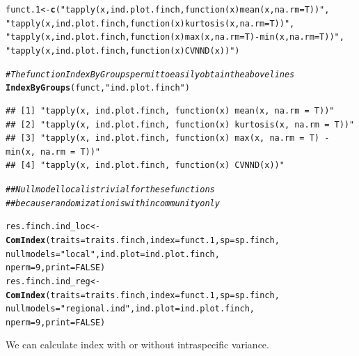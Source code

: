 \documentclass[12pt]{article}\usepackage[]{graphicx}\usepackage[]{color}
\makeatletter
\newcommand{\hlnum}[1]{\textcolor[rgb]{0.686,0.059,0.569}{#1}}%
\newcommand{\hlstr}[1]{\textcolor[rgb]{0.192,0.494,0.8}{#1}}%
\newcommand{\hlcom}[1]{\textcolor[rgb]{0.678,0.584,0.686}{\textit{#1}}}%
\newcommand{\hlstd}[1]{\textcolor[rgb]{0.345,0.345,0.345}{#1}}%
\newcommand{\hlkwb}[1]{\textcolor[rgb]{0.69,0.353,0.396}{#1}}%
\newcommand{\hlkwc}[1]{\textcolor[rgb]{0.333,0.667,0.333}{#1}}%
\newcommand{\hlkwd}[1]{\textcolor[rgb]{0.737,0.353,0.396}{\textbf{#1}}}%
\newenvironment{kframe}{%
 \def\at@end@of@kframe{}%
 \ifinner\ifhmode%
  \def\at@end@of@kframe{\end{minipage}}%
  \begin{minipage}{\columnwidth}%
 \fi\fi%
 \def\FrameCommand##1{\hskip\@totalleftmargin \hskip-\fboxsep
 \colorbox{shadecolor}{##1}\hskip-\fboxsep
     \hskip-\linewidth \hskip-\@totalleftmargin \hskip\columnwidth}%
 \MakeFramed {\advance\hsize-\width
   \@totalleftmargin\z@ \linewidth\hsize
   \@setminipage}}%
 {\par\unskip\endMakeFramed%
 \at@end@of@kframe}
\newenvironment{knitrout}{}{} %
\makeatother
\begin{document}
\begin{knitrout}
\color{fgcolor}\begin{kframe}
\begin{alltt}
\hlstd{funct.1}\hlkwb{<-}\hlkwd{c}\hlstd{(}\hlstr{"tapply(x, ind.plot.finch, function(x) mean(x, na.rm = T))"}\hlstd{,}
     \hlstr{"tapply(x, ind.plot.finch, function(x) kurtosis(x, na.rm = T))"}\hlstd{,}
     \hlstr{"tapply(x, ind.plot.finch, function(x) max(x, na.rm = T)-min(x, na.rm = T))"}\hlstd{,}
     \hlstr{"tapply(x, ind.plot.finch, function(x) CVNND(x))"} \hlstd{)}

\hlcom{#The function IndexByGroups permit to easily obtain the above lines }
\hlkwd{IndexByGroups}\hlstd{(funct,} \hlstr{"ind.plot.finch"}\hlstd{)}
\end{alltt}
\begin{verbatim}
## [1] "tapply(x, ind.plot.finch, function(x) mean(x, na.rm = T))"                   
## [2] "tapply(x, ind.plot.finch, function(x) kurtosis(x, na.rm = T))"               
## [3] "tapply(x, ind.plot.finch, function(x) max(x, na.rm = T) - min(x, na.rm = T))"
## [4] "tapply(x, ind.plot.finch, function(x) CVNND(x))"
\end{verbatim}
\begin{alltt}
\hlcom{##Null model local is trivial for these functions}
\hlcom{##because randomization is within community only}

\hlstd{res.finch.ind_loc}\hlkwb{<-}\hlkwd{ComIndex}\hlstd{(}\hlkwc{traits} \hlstd{= traits.finch,} \hlkwc{index} \hlstd{= funct.1,} \hlkwc{sp} \hlstd{= sp.finch,}
               \hlkwc{nullmodels} \hlstd{=} \hlstr{"local"}\hlstd{,} \hlkwc{ind.plot} \hlstd{= ind.plot.finch,}
               \hlkwc{nperm} \hlstd{=} \hlnum{9}\hlstd{,} \hlkwc{print} \hlstd{=} \hlnum{FALSE}\hlstd{)}
\hlstd{res.finch.ind_reg}\hlkwb{<-}\hlkwd{ComIndex}\hlstd{(}\hlkwc{traits} \hlstd{= traits.finch,} \hlkwc{index} \hlstd{= funct.1,} \hlkwc{sp} \hlstd{= sp.finch,}
               \hlkwc{nullmodels} \hlstd{=} \hlstr{"regional.ind"}\hlstd{,} \hlkwc{ind.plot} \hlstd{= ind.plot.finch,}
               \hlkwc{nperm} \hlstd{=} \hlnum{9}\hlstd{,} \hlkwc{print} \hlstd{=} \hlnum{FALSE}\hlstd{)}
\end{alltt}
\end{kframe}
\end{knitrout}


We can calculate index with or without intraspecific variance.
\end{document}
